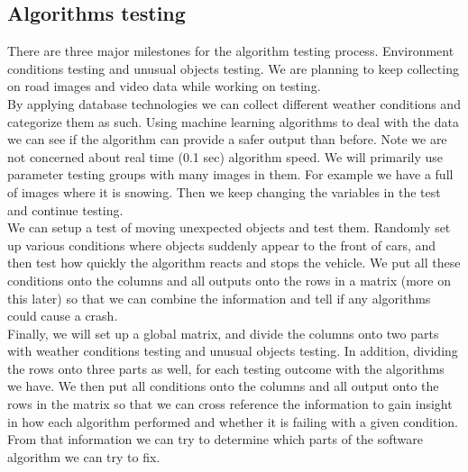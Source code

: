 \documentclass[10pt,draftclsnofoot,onecolumn,journal,compsoc]{IEEEtran}
\begin{document}
\subsection{Algorithms testing}
There are three major milestones for the algorithm testing process. Environment conditions testing and unusual objects testing. We are planning to keep collecting on road images and video data while working on testing.\\
By applying database technologies we can collect different weather conditions and categorize them as such. Using machine learning algorithms to deal with the data we can see if the algorithm can provide a safer output than before. Note we are not concerned about real time (0.1 sec) algorithm speed. 
We will primarily use parameter testing groups with many images in them. For example we have a full of images where it is snowing. Then we keep changing the variables in the test and continue testing.\\
We can setup a test of moving unexpected objects and test them. Randomly set up various conditions where objects suddenly appear to the front of cars, and then test how quickly the algorithm reacts and stops the vehicle. We put all these conditions onto the columns and all outputs onto the rows in a matrix (more on this later) so that we can combine the information and tell if any algorithms could cause a crash.\\
Finally, we will set up a global matrix, and divide the columns onto two parts with weather conditions testing and unusual objects testing. In addition, dividing the rows onto three parts as well, for each testing outcome with the algorithms we have. We then put all conditions onto the columns and all output onto the rows in the matrix so that we can cross reference the information to gain insight in how each algorithm performed and whether it is failing with a given condition. From that information we can try to determine which parts of the software algorithm we can try to fix.
\end{document}
